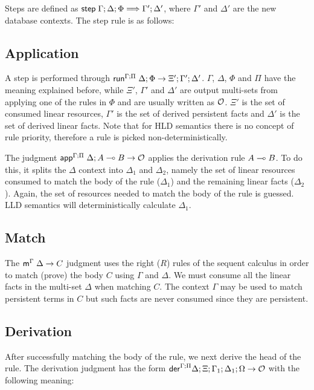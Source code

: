 Steps are defined as $\mathsf{step} \; \Gamma; \Delta; \Phi \Longrightarrow \Gamma';
\Delta'$, where $\Gamma'$ and $\Delta'$ are the new database contexts. The step
rule is as follows:

%

\subsection{Application}

A step is performed through
$\mathsf{run}^{\Gamma ; \Pi} \; \Delta ; \Phi \rightarrow \Xi' ; \Gamma'; \Delta'$.
$\Gamma$, $\Delta$, $\Phi$ and $\Pi$ have the meaning explained
before, while $\Xi'$, $\Gamma'$ and $\Delta'$ are output multi-sets from
applying one of the rules in $\Phi$ and are usually written as $\mathcal{O}$. $\Xi'$ is
the set of consumed linear resources, $\Gamma'$ is the set of derived persistent
facts and $\Delta'$ is the set of derived linear facts.  Note that for HLD
semantics there is no concept of rule priority, therefore a rule is picked
non-deterministically.

The judgment $\mathsf{app}^{\Gamma ; \Pi} \; \Delta ; A \multimap B \rightarrow \mathcal{O}$
applies the derivation rule $A \multimap B$. To do this, it
splits the $\Delta$ context into $\Delta_1$ and $\Delta_2$, namely the set of
linear resources consumed to match the body of the rule ($\Delta_1$) and the
remaining linear facts ($\Delta_2$).  Again, the set of resources needed to
match the body of the rule is guessed. LLD semantics will deterministically
calculate $\Delta_1$.



\subsection{Match}

The $\mathsf{m}^{\Gamma} \; \Delta \rightarrow C$ judgment uses the right ($R$) rules of the sequent
calculus in order to match (prove) the body $C$ using $\Gamma$ and $\Delta$. We
must consume all the linear facts in the multi-set $\Delta$ when matching $C$.
The context $\Gamma$ may be used to match persistent terms in $C$ but such facts
are never consumed since they are persistent.



\subsection{Derivation}

After successfully matching the body of the rule, we next derive the head of the
rule. The derivation judgment has the form
$\mathsf{der}^{\Gamma ; \Pi} \Delta ; \Xi; \Gamma_1; \Delta_1; \Omega \rightarrow \mathcal{O}$ with the
following meaning:

